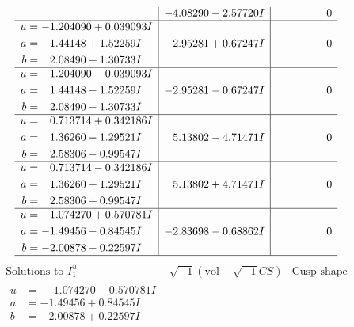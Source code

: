\documentclass[1p]{elsarticle_modified}
\theoremstyle{definition}
\newcommand{\I}{\sqrt{-1}}
\begin{document}
$$\begin{array}{c|c|c}
 & -4.08290 - 2.57720 I & \phantom{-0.000000 } 0 \\ \hline\begin{aligned}
u &= -1.204090 + 0.039093 I \\
a &= \phantom{-}1.44148 + 1.52259 I \\
b &= \phantom{-}2.08490 + 1.30733 I\end{aligned}
 & -2.95281 + 0.67247 I & \phantom{-0.000000 } 0 \\ \hline\begin{aligned}
u &= -1.204090 - 0.039093 I \\
a &= \phantom{-}1.44148 - 1.52259 I \\
b &= \phantom{-}2.08490 - 1.30733 I\end{aligned}
 & -2.95281 - 0.67247 I & \phantom{-0.000000 } 0 \\ \hline\begin{aligned}
u &= \phantom{-}0.713714 + 0.342186 I \\
a &= \phantom{-}1.36260 - 1.29521 I \\
b &= \phantom{-}2.58306 - 0.99547 I\end{aligned}
 & \phantom{-}5.13802 - 4.71471 I & \phantom{-0.000000 } 0 \\ \hline\begin{aligned}
u &= \phantom{-}0.713714 - 0.342186 I \\
a &= \phantom{-}1.36260 + 1.29521 I \\
b &= \phantom{-}2.58306 + 0.99547 I\end{aligned}
 & \phantom{-}5.13802 + 4.71471 I & \phantom{-0.000000 } 0 \\ \hline\begin{aligned}
u &= \phantom{-}1.074270 + 0.570781 I \\
a &= -1.49456 - 0.84545 I \\
b &= -2.00878 - 0.22597 I\end{aligned}
 & -2.83698 - 0.68862 I & \phantom{-0.000000 } 0\\
 \hline 
 \end{array}$$\newpage$$\begin{array}{c|c|c}  
\text{Solutions to }I^u_{1}& \I (\text{vol} + \sqrt{-1}CS) & \text{Cusp shape}\\
 \hline 
\begin{aligned}
u &= \phantom{-}1.074270 - 0.570781 I \\
a &= -1.49456 + 0.84545 I \\
b &= -2.00878 + 0.22597 I\end{aligned}

\end{array}$$
\end{document}
